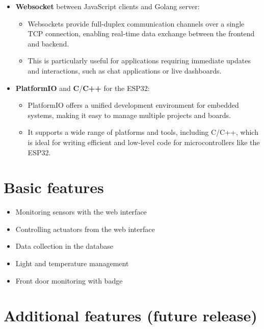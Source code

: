 \documentclass{report}
\begin{document}
\begin{itemize}
            \item \textbf{Websocket} between JavaScript clients and Golang server:
                \begin{itemize}
                \item Websockets provide full-duplex communication channels over a single TCP connection, enabling real-time data exchange between the frontend and backend.
                \item This is particularly useful for applications requiring immediate updates and interactions, such as chat applications or live dashboards.
                \end{itemize}

            \item \textbf{PlatformIO} and \textbf{C}/\textbf{C++} for the ESP32:
                \begin{itemize}
                \item PlatformIO offers a unified development environment for embedded systems, making it easy to manage multiple projects and boards.
                \item It supports a wide range of platforms and tools, including C/C++, which is ideal for writing efficient and low-level code for microcontrollers like the ESP32.
                \end{itemize}
        \end{itemize}

    \section{Basic features}\label{sec:basic-features}

        \begin{itemize}
            \item Monitoring sensors with the web interface
            \item Controlling actuators from the web interface
            \item Data collection in the database
            \item Light and temperature management
            \item Front door monitoring with  badge
        \end{itemize}

    \section{Additional features (future release)}\label{sec:additional-features-(future-release)}
\end{document}

